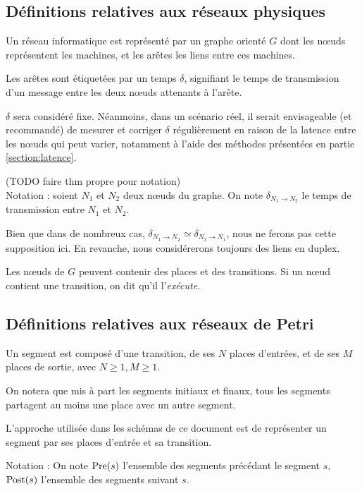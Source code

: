 \subsection{Définitions relatives aux réseaux physiques}
\begin{mydef}
Un réseau informatique est représenté par un graphe orienté $G$ dont les nœuds représentent les machines, et les arêtes les liens entre ces machines. 

Les arêtes sont étiquetées par un temps $\delta$, signifiant le temps de transmission d'un message entre les deux nœuds attenants à l'arête.
\end{mydef}
$\delta$ sera considéré fixe. Néanmoins, dans un scénario réel, il serait envisageable (et recommandé) de mesurer et corriger $\delta$ régulièrement en raison de la latence entre les nœuds qui peut varier, notamment à l'aide des méthodes présentées en partie \ref{section:latence}.

(TODO faire thm propre pour notation) \\
Notation : soient $N_1$ et $N_2$ deux nœuds du graphe. On note $\delta_{N_1 \rightarrow N_2}$ le temps de transmission entre $N_1$ et $N_2$. 

Bien que dans de nombreux cas, $\delta_{N_1 \rightarrow N_2} \simeq \delta_{N_2 \rightarrow N_1}$, nous ne ferons pas cette supposition ici. En revanche, nous considérerons toujours des liens en duplex.

Les nœuds de $G$ peuvent contenir des places et des transitions. Si un nœud contient une transition, on dit qu'il l'\textit{exécute}.

\subsection{Définitions relatives aux réseaux de Petri}
\begin{mydef}
Un segment est composé d'une transition, de ses $N$ places d'entrées, et de ses $M$ places de sortie, avec $N \geq 1, M \geq 1$.
\end{mydef}

On notera que mis à part les segments initiaux et finaux, tous les segments partagent au moins une place avec un autre segment.

L'approche utilisée dans les schémas de ce document est de représenter un segment par ses places d'entrée et sa transition.

Notation : On note $\operatorname{Pre}(s)$ l'ensemble des segments précédant le segment $s$, $\operatorname{Post}(s)$ l'ensemble des segments suivant $s$.

